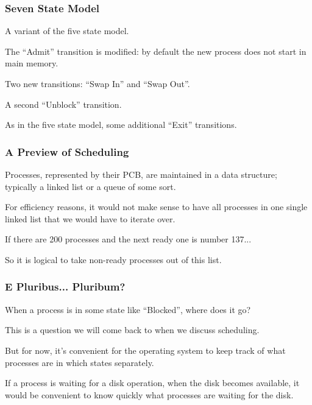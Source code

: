 \begin{frame}
\frametitle{Seven State Model}
A variant of the five state model.

The ``Admit'' transition is modified: by default the new process does not start in main memory.

Two new transitions: ``Swap In'' and ``Swap Out''.

A second ``Unblock'' transition.

As in the five state model, some additional ``Exit'' transitions.

\end{frame}




\begin{frame}
\frametitle{A Preview of Scheduling}

Processes, represented by their PCB, are maintained in a data structure; typically a linked list or a queue of some sort. 

For efficiency reasons, it would not make sense to have all processes in one single linked list that we would have to iterate over. 

If there are 200 processes and the next ready one is number 137...

So it is logical to take non-ready processes out of this list.

\end{frame}



\begin{frame}
\frametitle{E Pluribus... Pluribum?}

When a process is in some state like ``Blocked'', where does it go? 

This is a question we will come back to when we discuss scheduling.

But for now, it's convenient for the operating system to keep track of what processes are in which states separately. 

If a process is waiting for a disk operation, when the disk becomes available, it would be convenient to know quickly what processes are waiting for the disk.

\end{frame}



